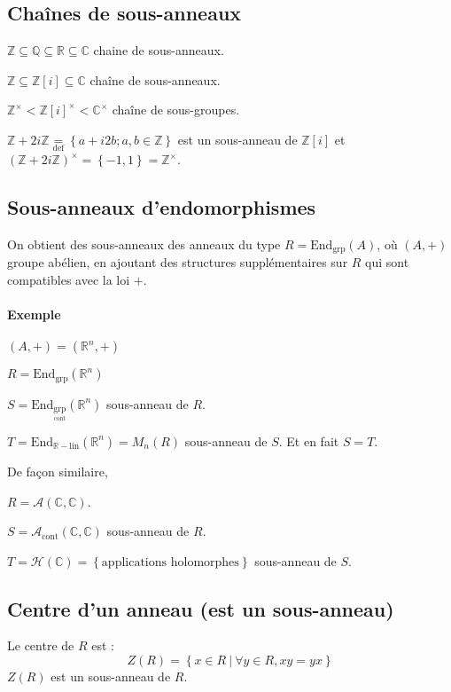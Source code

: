 \documentclass[reqno,a4paper,10pt]{report}
\makeatletter
\newcommand{\set}[1]{\left\lbrace #1 \right\rbrace} %
\newcommand{\IZ}{\ensuremath{\mathbb{Z}}\xspace} %
\newcommand{\IR}{\ensuremath{\mathbb{R}}\xspace} %
\newcommand{\IQ}{\ensuremath{\mathbb{Q}}\xspace} %
\newcommand{\IC}{\ensuremath{\mathbb{C}}\xspace} %
\newcommand{\Endgrp}[1]{\text{End}_{\text{grp}}\left(#1\right)}
\newcommand{\Endom}[2]{\text{End}_{#1}\left(#2\right)}
\newcommand{\such}{\ | \ }
\newcommand{\tdef}[1]{\underset{\text{def}}{ #1 }}
\let\olditemize=\itemize%
\renewenvironment{itemize}{%
    \olditemize%
  }{%
    \@noparlisttrue%
    \endlist%
  }%
\makeatother
\begin{document}
\subsection{Chaînes de sous-anneaux}
\begin{itemize}
  \item $\IZ \subseteq \IQ \subseteq \IR \subseteq \IC$ chaine de
    sous-anneaux.
  \item $\IZ \subseteq \IZ[i] \subseteq \IC$ chaîne de sous-anneaux.
  \item $\IZ^\times < {\IZ[i]}^\times < \IC^\times$ chaîne de sous-groupes.
  \item $\IZ + 2i\IZ \tdef{=} \set{a+i2b; a,b \in \IZ}$ est un sous-anneau
    de $\IZ[i]$ et ${(\IZ+2i\IZ)}^\times = \set{-1, 1} = \IZ^\times$.
\end{itemize}

\subsection{Sous-anneaux d'endomorphismes}
On obtient des sous-anneaux des anneaux du type $R=\Endgrp{A}$, où $(A,+)$
groupe abélien, en ajoutant des structures supplémentaires sur $R$ qui sont
compatibles avec la loi $+$.

\paragraph{Exemple} $(A,+) = (\IR^n, +)$
\begin{itemize}
  \item $R = \Endgrp{\IR^n}$
  \item $S=\Endom{\underset{\text{cont}}{\text{grp}}}{\IR^n}$ sous-anneau de
    $R$.
  \item $T=\Endom{\IR-\text{lin}}{\IR^n}=M_n(R)$ sous-anneau de $S$. Et en fait
    $S=T$.
\end{itemize}

De façon similaire, 
\begin{itemize}
  \item $R=\mathcal{A}(\IC, \IC)$.
  \item $S=\mathcal{A}_\text{cont}(\IC, \IC)$ sous-anneau de $R$.
  \item $T=\mathscr{H}(\IC)=\set{\text{applications holomorphes}}$ sous-anneau
    de $S$.
\end{itemize}

\subsection{Centre d'un anneau (est un sous-anneau)}
Le centre de $R$ est :
\[Z(R)=\set{x \in R \such \forall y \in R, xy=yx}\]
$Z(R)$ est un sous-anneau de $R$.
\end{document}
